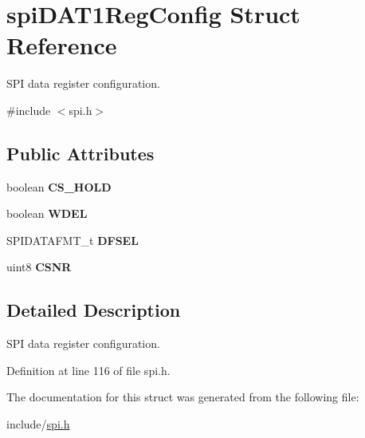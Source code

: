 \hypertarget{structspiDAT1RegConfig}{}\section{spi\+D\+A\+T1\+Reg\+Config Struct Reference}
\label{structspiDAT1RegConfig}


S\+PI data register configuration.  




{\ttfamily \#include $<$spi.\+h$>$}

\subsection*{Public Attributes}
\begin{DoxyCompactItemize}
\item 
\mbox{\label{structspiDAT1RegConfig_a408e72cbc6e94687115af3c59054074b}} 
boolean {\bfseries C\+S\+\_\+\+H\+O\+LD}
\item 
\mbox{\label{structspiDAT1RegConfig_a5aaa1afc0b17311e3067b0bc8199b023}} 
boolean {\bfseries W\+D\+EL}
\item 
\mbox{\label{structspiDAT1RegConfig_a49bc387f3d53391904be5a37b3513cee}} 
S\+P\+I\+D\+A\+T\+A\+F\+M\+T\+\_\+t {\bfseries D\+F\+S\+EL}
\item 
\mbox{\label{structspiDAT1RegConfig_a7ba05ca01fe55b1bc6489da7f5990715}} 
uint8 {\bfseries C\+S\+NR}
\end{DoxyCompactItemize}


\subsection{Detailed Description}
S\+PI data register configuration. 

Definition at line 116 of file spi.\+h.



The documentation for this struct was generated from the following file\+:\begin{DoxyCompactItemize}
\item 
include/\mbox{\hyperlink{spi_8h}{spi.\+h}}\end{DoxyCompactItemize}

